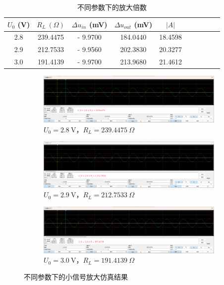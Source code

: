 \documentclass[UTF8]{report}
\theoremstyle{MyLineTheoremStyle} %
\theoremstyle{MyBlockTheoremStyle} %
\theoremstyle{MySubsubsectionStyle} %
\begin{document}
\begin{table}[H]\centering
    \caption{不同参数下的放大倍数}
    \label{不同参数下的放大倍数}
\begin{tabular}{cccccccccc}\toprule
    $U_0$ (V) & $R_L \ (\Omega)$  & $\Delta u_{in}$ (mV) & $\Delta u_{out}$ (mV) & $| A |$  \\
    \midrule
    2.8 & 239.4475 & - 9.9700 & 184.0440 & 18.4598 \\
    2.9 & 212.7533 & - 9.9560 & 202.3830 & 20.3277 \\
    3.0 & 191.4139 & - 9.9700 & 213.9680 & 21.4612 \\
    \bottomrule
\end{tabular}
\end{table}
\begin{figure}[H]\centering
    \begin{subfigure}[b]{\columnwidth}\centering
        \includegraphics[width=\columnwidth]{assets/Sim2/27f82881b37a26d47cbed27992e8c8e0.png}
        \caption{$U_0 = 2.8 \ \mathrm{V}$，$R_L = 239.4475 \ \Omega$}
    \end{subfigure}\hfill
    \begin{subfigure}[b]{\columnwidth}\centering
        \includegraphics[width=\columnwidth]{assets/Sim2/f5273a2abd08cf930292d4358b4e5574.png}
        \caption{$U_0 = 2.9 \ \mathrm{V}$，$R_L = 212.7533 \ \Omega$}
    \end{subfigure}
    \begin{subfigure}[b]{\columnwidth}\centering
        \includegraphics[width=\columnwidth]{assets/Sim2/108ed484609fdd2b343605940e0020d9.png}
        \caption{$U_0 = 3.0 \ \mathrm{V}$，$R_L = 191.4139 \ \Omega$}
    \end{subfigure}
    \caption{不同参数下的小信号放大仿真结果}\label{不同参数下的小信号放大仿真结果}
\end{figure}
\end{document}
